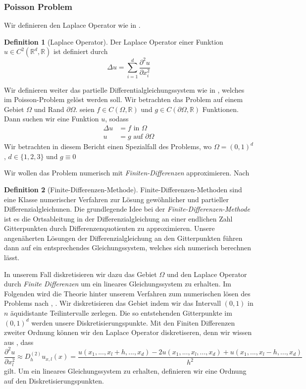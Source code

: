 \documentclass[smallheadings]{scrartcl}
\theoremstyle{definition}
\newtheorem{definition}{Definition}[section]
\begin{document}
	\subsubsection{Poisson Problem}
		 \cbstart Wir definieren den Laplace Operator wie in \citep{PDE}.
		\begin{definition}[Laplace Operator]
		Der Laplace Operator einer Funktion $u\in C^2(\mathbb{R}^d,\mathbb{R})$ ist definiert durch
		$$\Delta u=\sum_{i=1}^d\frac{\partial ^2 u}{\partial x_i^2}$$

		\end{definition}
		Wir definieren weiter das partielle Differentialgleichungssystem wie in \citep{PDE}, welches im Poisson-Problem gelöst werden soll. Wir betrachten das Problem auf einem  Gebiet  $\Omega$ und Rand $\partial \Omega$. seien $f\in C(\Omega , \mathbb{R})$ und $g\in C(\partial \Omega , \mathbb{R})$ Funktionen. Dann suchen wir eine Funktion $u$, sodass
		\begin{align*}
		\Delta u&=f \text{ in }\Omega\\
		u&= g \text{ auf }\partial\Omega
		\end{align*}
		Wir betrachten in diesem Bericht einen Spezialfall des Problems, wo $\Omega =(0,1)^d$, $d\in \{1,2,3\}$ und $g\equiv 0$

		Wir wollen das Problem numerisch mit \textit{Finiten-Differenzen} approximieren. Nach \citep{finite}
		\begin{definition}[Finite-Differenzen-Methode]
		Finite-Differenzen-Methoden sind eine Klasse numerischer Verfahren zur Lösung gewöhnlicher und partieller Differenzialgleichunen.		
		Die grundlegende Idee bei der \textit{Finite-Differenzen-Methode} ist es die Ortsableitung in der Differenzialgleichung an einer endlichen Zahl Gitterpunkten durch Differenzenquotienten zu approximieren. Unsere angenäherten Lösungen der Differenzialgleichung an den Gitterpunkten führen dann auf ein entsprechendes Gleichungssystem, welches sich numerisch berechnen lässt.
		\end{definition}
		In unserem Fall diskretisieren wir dazu das Gebiet $\Omega$ und den Laplace Operator durch \textit{Finite Differenzen} um ein lineares Gleichungssystem zu erhalten.
		 Im Folgenden wird die Theorie hinter unserem Verfahren zum numerischen lösen des Problems nach \citep{PDE}, \citep{Wiki}. Wir diskretisieren das Gebiet indem wir das Intervall $(0,1)$ in $n$ äquidistante Teilintervalle zerlegen. Die so entstehenden Gitterpunkte im $(0,1)^d$ werden unsere Diskretisierungspunkte. Mit den Finiten Differenzen zweiter Ordnung können wir den Laplace Operator diskretiseren, denn wir wissen aus \citep{Wiki}, dass 
		$$\frac{\partial^2u}{\partial x_l^2} \approx D_h^{(2)} u_{x,l}(x) =\frac{u(x_1,...,x_l+h,...,x_d) - 2u(x_1,...,x_l,...,x_d) + u(x_1,...,x_l-h,...,x_d)}{h^2}$$
		gilt. 
		Um ein lineares Gleichungssystem zu erhalten, definieren wir eine Ordnung auf den Diskretisierungspunkten.
		
\end{document}
